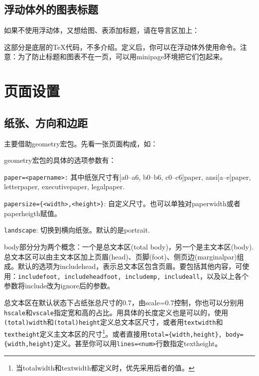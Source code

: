 {\subsection{浮动体外的图表标题}
如果不使用浮动体，又想给图、表添加标题，请在导言区加上：
\begin{latex}{}
\makeatletter
\newcommand\figcaption{\def\@captype{figure}\caption}
\newcommand\tabcaption{\def\@captype{table}\caption}
\makeatother
\end{latex}

这部分是底层的\TeX 代码，不多介绍。定义后，你可以在浮动体外使用命令。注意：为了防止标题和图表不在一页，可以用minipage环境把它们包起来。

\section{页面设置}

\subsection{纸张、方向和边距}
主要借助geometry宏包。先看一张页面构成，如：
\begin{figure}
\centering

\label{fig:geo-paper}
\end{figure}

geometry宏包的具体的选项参数有：
\begin{feai}
\item \texttt{paper=<papername>:} 其中纸张尺寸有[a0--a6, b0--b6, c0--c6]paper, ansi[a--e]paper, letterpaper, executivepaper, legalpaper. 
\item \texttt{papersize=\{<width>,<height>\}}: 自定义尺寸。也可以单独对paperwidth或者paperheigth赋值。
\item \texttt{landscape}: 切换到横向纸张。默认的是portrait. 
\end{feai}

body部分分为两个概念：一个是总文本区(total body)，另一个是主文本区(body). 总文本区可以由主文本区加上页眉(head)、页脚(foot)、侧页边(marginalpar)组成。默认的选项为includehead，表示总文本区包含页眉。要包括其他内容，可使用：\texttt{includefoot, includeheadfoot, includemp, includeall}，以及以上各个参数将include改为ignore后的参数。

总文本区在默认状态下占纸张总尺寸的0.7，由scale=0.7控制，你也可以分别用\texttt{hscale}和\texttt{vscale}指定宽和高的占比。用具体的长度定义也是可以的，使用\texttt{(total)width}和\texttt{(total)height}定义总文本区尺寸，或者用\texttt{textwidth}和\texttt{textheight}定义主文本区的尺寸\footnote{当totalwidth和textwidth都定义时，优先采用后者的值。}。或者直接用\texttt{total=\{width,height\}, body=\{width,height\}}定义。甚至你可以用\texttt{lines=<num>}行数指定textheight。

}
